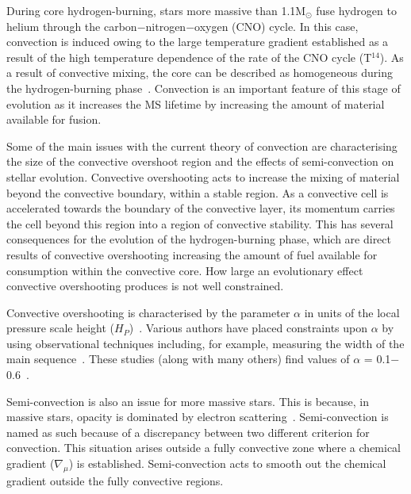 During core hydrogen-burning, stars more massive than 1.1M$_{\odot}$ fuse hydrogen to helium through the carbon$-$nitrogen$-$oxygen (CNO) cycle.
In this case, convection is induced owing to the large temperature gradient established as a result of the high temperature dependence of the rate of the CNO cycle (T$^{14}$).
As a result of convective mixing, the core can be described as homogeneous during the hydrogen-burning phase~\citep{b:KippenhahnWeigert}.
Convection is an important feature of this stage of evolution as it increases the MS lifetime by increasing the amount of material available for fusion.

Some of the main issues with the current theory of convection are characterising the size of the convective overshoot region and the effects of semi-convection on stellar evolution.
Convective overshooting acts to increase the mixing of material beyond the convective boundary, within a stable region.
As a convective cell is accelerated towards the boundary of the convective layer, its momentum carries the cell beyond this region into a region of convective stability.
This has several consequences for the evolution of the hydrogen-burning phase, which are direct results of convective overshooting increasing the amount of fuel available for consumption within the convective core.
How large an evolutionary effect convective overshooting produces is not well constrained.

Convective overshooting is characterised by the parameter $\alpha$ in units of the local pressure scale height ($H_{P}$)~\citep{b:KippenhahnWeigert}.
Various authors have placed constraints upon $\alpha$ by using observational techniques including, for example, measuring the width of the main sequence~\citep{Schroder97,Brott11}.
These studies (along with many others) find values of $\alpha$ = 0.1$-$0.6~\citep[a recent example is][finding $\alpha = 0.335$]{Brott11}.

Semi-convection is also an issue for more massive stars.
This is because, in massive stars, opacity is dominated by electron scattering~\citep{b:Bohm-vitense92.v3}.
Semi-convection is named as such because of a discrepancy between two different criterion for convection.
This situation arises outside a fully convective zone where a chemical gradient ($\nabla _{\mu}$) is established.
Semi-convection acts to smooth out the chemical gradient outside the fully convective regions.


